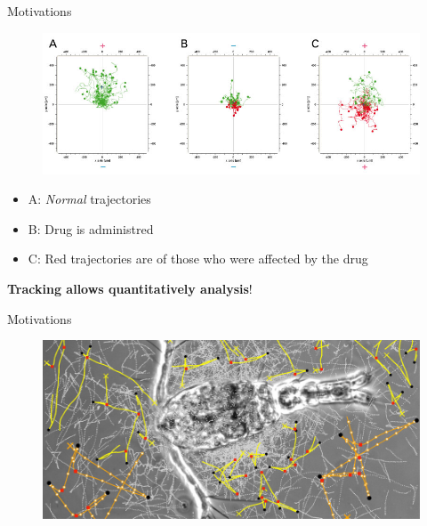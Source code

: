 \documentclass{beamer}
\begin{document}
		\begin{frame}{Motivations}
				\begin{figure}
					\centering
					\includegraphics[scale=0.38]{./images/motivations.png}
				\end{figure}

				\begin{itemize}
					\item A: \textit{Normal} trajectories
					\item B: Drug is administred
					\item C: Red trajectories are of those who were affected by the drug
				\end{itemize}
				\textbf{Tracking allows  quantitatively analysis}!
	\end{frame}
	
		\begin{frame}{Motivations}
				\begin{figure}
					\centering
					\includegraphics[scale=0.30]{./images/motivations2.png}
				\end{figure}

			

	\end{frame}
	
\end{document}
